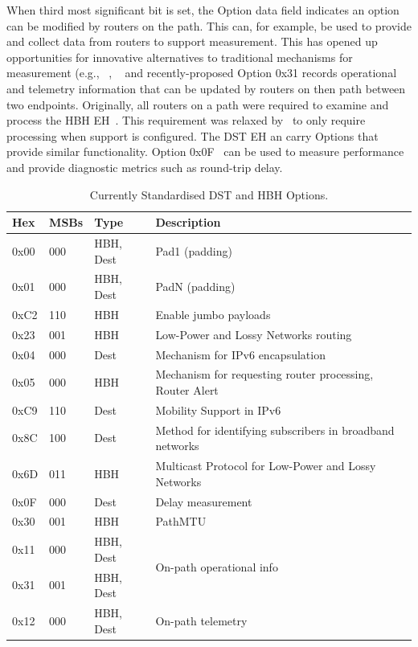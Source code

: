 \documentclass[conference]{IEEEtran}
\begin{document}
When third most significant bit is set, the Option data field indicates an option can be modified by routers on the path. This can, for example, be used to provide and collect data from routers to support measurement. This has opened up opportunities for innovative alternatives to traditional mechanisms for measurement (e.g., ~\cite{rfc9268}, ~\cite{rfc9343} and recently-proposed Option 0x31 records operational and telemetry information that can be updated by routers on then path between two endpoints.
Originally, all routers on a path were required to examine and process the HBH EH~\cite{rfc2460}. This requirement was relaxed by~\cite{RFC8200} to only require processing when support is  configured.
The DST EH an carry Options that provide similar functionality. Option 0x0F~\cite{rfc8250} can be used to measure performance and provide diagnostic metrics such as round-trip delay. 


\begin{table}[b]
\center
\caption{Currently Standardised DST and HBH Options.}
\begin{tabular}{p{}|p{}|l|p{}}
Hex  & MSBs & Type      & Description                                              \\
\hline
\hline
0x00 & 000  & HBH, Dest & Pad1 (padding)                                           \\
0x01 & 000  & HBH, Dest & PadN (padding)                                           \\
0xC2 & 110  & HBH       & Enable jumbo payloads                                    \\
0x23 & 001  & HBH       & Low-Power and Lossy Networks routing                     \\
0x04 & 000  & Dest      & Mechanism for IPv6 encapsulation                 \\
0x05 & 000  & HBH       & Mechanism for requesting router processing, Router Alert              \\
0xC9 & 110  & Dest      & Mobility Support in IPv6                                 \\
0x8C & 100  & Dest      & Method for identifying subscribers in broadband networks \\
0x6D & 011  & HBH       & Multicast Protocol for Low-Power and  Lossy Networks     \\
0x0F & 000  & Dest      & Delay measurement                                        \\
0x30 & 001  & HBH       & PathMTU                                     \\
0x11 & 000  & HBH, Dest & \multirow{2}{*}{On-path operational info}                \\
0x31 & 001  & HBH, Dest &                                                          \\
0x12 & 000  & HBH, Dest & On-path telemetry                                       
\end{tabular}
  \label{tbl:options}
\end{table}
\end{document}
